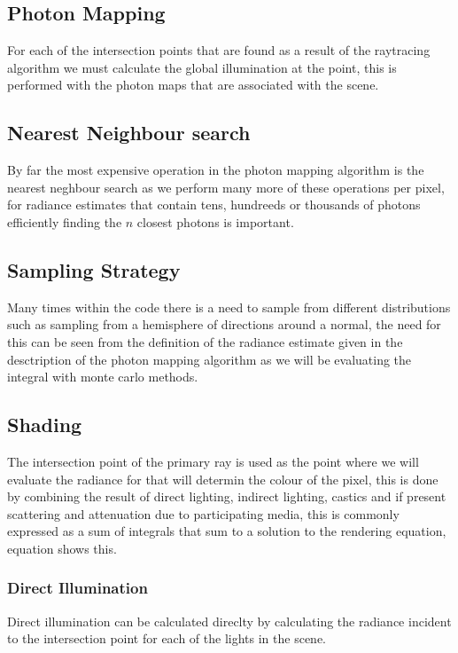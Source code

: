 \subsection{Photon Mapping}
For each of the intersection points that are found as a result of the raytracing algorithm we must calculate the global
illumination at the point, this is performed with the photon maps that are associated with the scene.

\subsection{Nearest Neighbour search}
By far the most expensive operation in the photon mapping algorithm is the nearest neghbour search as we perform
many more of these operations per pixel, for radiance estimates that contain tens, hundreeds or thousands of photons
efficiently finding the $n$ closest photons is important.


\subsection{Sampling Strategy}
Many times within the code there is a need to sample from different distributions such as sampling from a hemisphere
of directions around a normal, the need for this can be seen from the definition of the radiance estimate given in
the desctription of the photon mapping algorithm as we will be evaluating the integral with monte carlo methods.

\subsection{Shading}
The intersection point of the primary ray is used as the point where we will evaluate the radiance for that will determin
the colour of the pixel, this is done by combining the result of direct lighting, indirect lighting, castics and if present
scattering and attenuation due to participating media, this is commonly expressed as a sum of integrals that sum to a solution
to the rendering equation, equation  shows this.

\subsubsection{Direct Illumination}
Direct illumination can be calculated direclty by calculating the radiance incident to the intersection point for each of the
lights in the scene.

